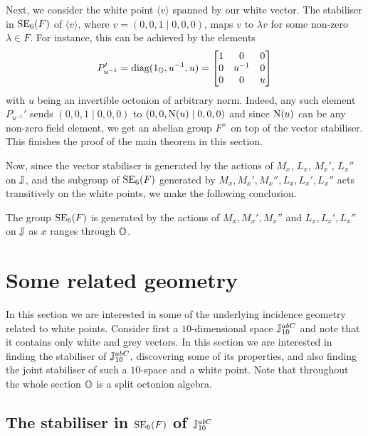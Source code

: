 Next, we consider the white point $\langle v \rangle$ spanned by our white vector. The stabiliser
in $\mathrm{SE}_6(F)$ of $\langle v \rangle$, where $v = (0,0,1\mid 0,0,0)$, maps 
$v$ to $\lambda v$ for some non-zero 
$\lambda \in F$. For instance, this can be achieved by the elements 
\begin{equation}
	\label{eq:puprime}
	P_{u^{-1}}' = \mathrm{diag}(1_{\mathbb{O}},u^{-1},u) = \begin{bmatrix}
		1 & 0 & 0 \\
		0 & u^{-1} & 0 \\
		0 & 0 & u
	\end{bmatrix}	 
\end{equation}
with 
$u$ being an invertible octonion of arbitrary norm. 
Indeed, any such element $P_{u^{-1}}'$ sends
$(0,0,1\mid 0,0,0)$ to $(0,0,\mathord{\mathrm{N}}(u)\mid 0,0,0)$ and since $\mathord{\mathrm{N}}(u)$ can be any non-zero 
field element, we get an abelian group $F^{\times}$ on top of the vector stabiliser. This finishes
the proof of the main theorem in this section. 

Now, since the vector stabiliser is generated by the actions of $M_x$, $L_x$, $M_x'$,
$L_x''$ on $\mathbb{J}$, and the subgroup of $\mathrm{SE}_6(F)$ generated by 
$M_x,M_x',M_x'',L_x,L_x',L_x''$ acts transitively on the white points, 
we make the following conclusion. 

\begin{theorem}
The group $\mathrm{SE}_6(F)$ is generated by the actions
of $M_x,M_x',M_x''$ and $L_x,L_x',L_x''$ on $\mathbb{J}$ as $x$ ranges through $\mathbb{O}$. 
\end{theorem}

\section{Some related geometry}
\label{section:1_geometry}

In this section we are interested in some of the underlying incidence geometry related to white 
points. Consider first a $10$-dimensional
space $\mathbb{J}_{10}^{abC}$ and note that it 
contains only white and grey vectors. In this section we are interested in finding the 
stabiliser of $\mathbb{J}_{10}^{abC}$, discovering some of its properties, and also finding
the joint stabiliser of such a $10$-space and a white point. 
Note that throughout the whole section $\mathbb{O}$ is a split 
octonion algebra. 

\subsection{The stabiliser in $\mathrm{SE}_6(F)$ of $\mathbb{J}_{10}^{abC}$}

